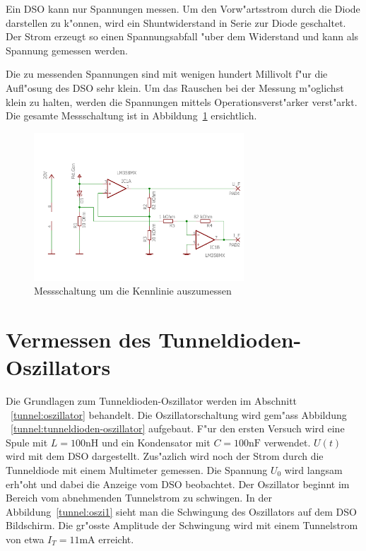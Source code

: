 \begin{refsection}
Ein DSO kann nur Spannungen messen. 
Um den Vorw"artsstrom durch die Diode darstellen zu k"onnen, wird ein Shuntwiderstand in Serie zur Diode geschaltet. 
Der Strom erzeugt so einen Spannungsabfall "uber dem Widerstand und kann als Spannung gemessen werden.

Die zu messenden Spannungen sind mit wenigen hundert Millivolt f"ur die Aufl"osung des DSO sehr klein. 
Um das Rauschen bei der Messung m"oglichst klein zu halten, werden die Spannungen mittels Operationsverst"arker verst"arkt. 
Die gesamte Messschaltung ist in Abbildung~\ref{tunnel:Messschaltung} ersichtlich.

\begin{figure}	%
\centering
\includegraphics[width=0.7\textwidth]{tunneldiode/images/Messschaltung.pdf}
\caption{Messschaltung um die Kennlinie auszumessen
\label{tunnel:Messschaltung}}
\end{figure}



\section{Vermessen des Tunneldioden-Oszillators}

Die Grundlagen zum Tunneldioden-Oszillator werden im Abschnitt ~\ref{tunnel:oszillator} behandelt. 
Die Oszillatorschaltung wird gem"ass Abbildung ~\ref{tunnel:tunneldioden-oszillator} aufgebaut. 
F"ur den ersten Versuch wird eine Spule mit $L=100\text{nH}$ und ein Kondensator mit $C=100\text{nF}$ verwendet. 
$U(t)$ wird mit dem DSO dargestellt. 
Zus"azlich wird noch der Strom durch die Tunneldiode mit einem Multimeter gemessen. 
Die Spannung $U_0$ wird langsam erh"oht und dabei die Anzeige vom DSO beobachtet. 
Der Oszillator beginnt im Bereich vom abnehmenden Tunnelstrom zu schwingen. 
In der Abbildung~\ref{tunnel:oszi1} sieht man die Schwingung des Oszillators auf dem DSO Bildschirm. 
Die gr"osste Amplitude der Schwingung wird mit einem Tunnelstrom von etwa $I_T = 11\text{mA}$ erreicht.


\end{refsection}
